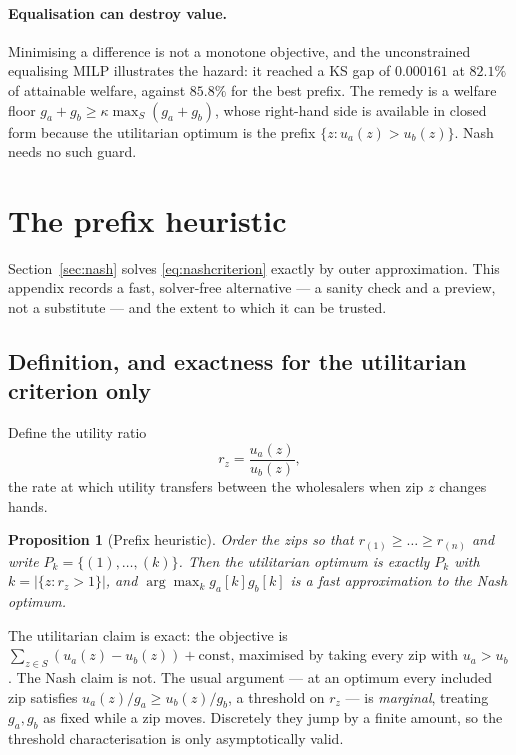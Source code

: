 \documentclass[11pt]{article}
\newtheorem{proposition}{Proposition}
\theoremstyle{remark}\newtheorem*{remark}{Remark}
\begin{document}
\paragraph{Equalisation can destroy value.} Minimising a difference is not a monotone
objective, and the unconstrained equalising MILP illustrates the hazard: it reached a KS
gap of $0.000161$ at $82.1\%$ of attainable welfare, against $85.8\%$ for the best
prefix. The remedy is a welfare floor $g_a+g_b\ge\kappa\max_S(g_a+g_b)$, whose
right-hand side is available in closed form because the utilitarian optimum is the
prefix $\{z:u_a(z)>u_b(z)\}$. Nash needs no such guard.

\section{The prefix heuristic}\label{app:prefix}
Section~\ref{sec:nash} solves \eqref{eq:nashcriterion} exactly by outer approximation.
This appendix records a fast, solver-free alternative --- a sanity check and a preview,
not a substitute --- and the extent to which it can be trusted.

\subsection{Definition, and exactness for the utilitarian criterion only}
Define the utility ratio
\begin{equation}
r_z=\frac{u_a(z)}{u_b(z)},
\end{equation}
the rate at which utility transfers between the wholesalers when zip $z$ changes hands.

\begin{resultbox}
\begin{proposition}[Prefix heuristic]\label{prop:prefix}
Order the zips so that $r_{(1)}\ge\dots\ge r_{(n)}$ and write $P_k=\{(1),\dots,(k)\}$.
Then the utilitarian optimum is exactly $P_k$ with $k=|\{z:r_z>1\}|$, and
$\arg\max_k g_a[k]g_b[k]$ is a fast approximation to the Nash optimum.
\end{proposition}
\end{resultbox}

\noindent The utilitarian claim is exact: the objective is
$\sum_{z\in S}(u_a(z)-u_b(z))+\text{const}$, maximised by taking every zip with
$u_a>u_b$. The Nash claim is not. The usual argument --- at an optimum every included
zip satisfies $u_a(z)/g_a\ge u_b(z)/g_b$, a threshold on $r_z$ --- is \emph{marginal},
treating $g_a,g_b$ as fixed while a zip moves. Discretely they jump by a finite amount,
so the threshold characterisation is only asymptotically valid.
\end{document}

